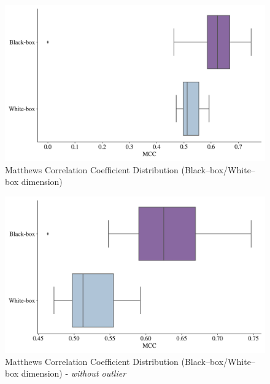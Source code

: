 \begin{figure}[H]
    \centering
    \caption{Matthews Correlation Coefficient Distribution (Black--box/White--box dimension)}\vspace{0.5em}
    \label{fig:mccdistbbwb}
    \includegraphics[width=140mm]{Figures/MCC_Distribution_BB_WB.jpg}
    
    \vspace{-1em}
\end{figure}

\begin{figure}[H]
    \centering
    \caption{Matthews Correlation Coefficient Distribution (Black--box/White--box dimension) - \textit{without outlier}}\vspace{0.5em}
    \label{fig:mccdistwooutbbwb}
    \includegraphics[width=140mm]{Figures/MCC_WO_OUTLIERS_Distribution_BB_WB.jpg}
    
    \vspace{-1em}
\end{figure}

